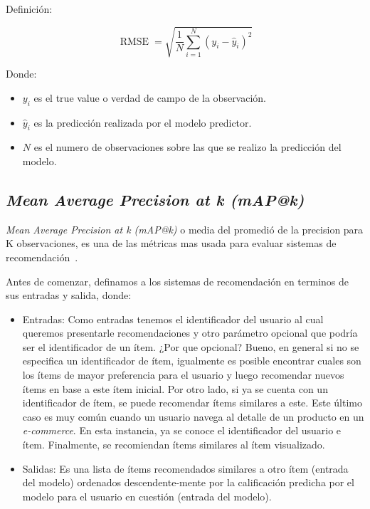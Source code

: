 \documentclass[11pt,a4paper,twoside]{thesis}
\begin{document}
\begin{description}
	\item[Definición:]
\end{description}
\begin{equation}
	\operatorname{RMSE}=\sqrt{  \frac{1}{N} \sum_{i=1}^N (y_i - \hat y_i)^2}
\end{equation}
\begin{description}
	\item[Donde:]
\end{description}
\begin{itemize}
	\item $y_i$ es el true value o verdad de campo de la observación.
	\item $\hat y_i$ es la predicción realizada por el modelo predictor.
	\item $N$ es el numero de observaciones sobre las que se realizo la predicción del modelo.
\end{itemize}

\subsection{\textit{Mean Average Precision at k (mAP@k)}}

\textit{Mean Average Precision at k (mAP@k)} o media del promedió de la
precision para K observaciones, es una de las métricas mas usada
para evaluar sistemas de recomendación~\cite{map_at_k_1, map_at_k_2, map_at_k_3}.

Antes de comenzar, definamos a los sistemas de recomendación en terminos de sus
entradas y salida, donde:

\begin{itemize}
	\item Entradas: Como entradas tenemos el identificador del usuario al cual queremos
	      presentarle recomendaciones y otro parámetro opcional que podría ser el
	      identificador de un ítem. ¿Por que opcional? Bueno, en general si no se
	      especifica un identificador de ítem, igualmente es posible encontrar cuales son
	      los ítems de mayor preferencia para el usuario y luego recomendar nuevos ítems
	      en base a este ítem inicial. Por otro lado, si ya se cuenta con un
	      identificador de ítem, se puede recomendar ítems similares a este. Este último
	      caso es muy común cuando un usuario navega al detalle de un producto en un
	      \textit{e-commerce}. En esta instancia, ya se conoce el identificador del
	      usuario e ítem. Finalmente, se recomiendan ítems similares al ítem visualizado.
	\item Salidas: Es una lista de ítems recomendados similares a otro ítem (entrada del
	      modelo) ordenados descendente-mente por la calificación predicha por el modelo
	      para el usuario en cuestión (entrada del modelo).
\end{itemize}
\end{document}
